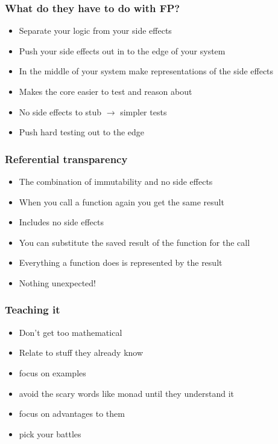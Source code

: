 \documentclass{beamer}
\begin{document}
\begin{frame}
  \frametitle{What do they have to do with FP?}
  \begin{itemize}
    \item Separate your logic from your side effects
    \item Push your side effects out in to the edge of your system
    \item In the middle of your system make representations of the side effects
    \item Makes the core easier to test and reason about
    \item No side effects to stub $\rightarrow$ simpler tests
    \item Push hard testing out to the edge
  \end{itemize}
\end{frame}

\begin{frame}
  \frametitle{Referential transparency}
  \begin{itemize}
    \item The combination of immutability and no side effects
    \item When you call a function again you get the same result
    \item Includes no side effects
    \item You can substitute the saved result of the function for the call
    \item Everything a function does is represented by the result
    \item Nothing unexpected!
  \end{itemize}
\end{frame}

\begin{frame}
  \frametitle{Teaching it}
  \begin{itemize}
    \item Don't get too mathematical
    \item Relate to stuff they already know
    \item focus on examples
    \item avoid the scary words like monad until they understand it
    \item focus on advantages to them
    \item pick your battles
  \end{itemize}
\end{frame}
\end{document}
